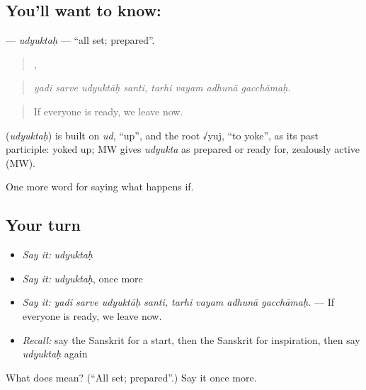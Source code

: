 \subsection*{You'll want to know: }
\textbf{} — \emph{udyuktaḥ} — \textquotedblleft{}all set; prepared\textquotedblright{}.

\begin{quote}
   ,    
\end{quote}

\begin{quote}
\emph{yadi sarve udyuktāḥ santi, tarhi vayam adhunā gacchāmaḥ.}
\end{quote}

\begin{quote}
If everyone is ready, we leave now.
\end{quote}

\begin{cousinweb}
\textbf{} (\emph{udyuktaḥ}) is built on \emph{ud}, \textquotedblleft{}up\textquotedblright{}, and the root √yuj, \textquotedblleft{}to yoke\textquotedblright{}, as its past participle: yoked up; MW gives \emph{udyukta} as prepared or ready for, zealously active (MW).
\end{cousinweb}

\begin{grammarlens}[title={What you've built}]
One more word for saying what happens if.
\end{grammarlens}

\subsection*{Your turn}
\begin{itemize}
\raggedright
  \item \emph{Say it:} \emph{udyuktaḥ}
  \item \emph{Say it:} \emph{udyuktaḥ}, once more
  \item \emph{Say it:} \emph{yadi sarve udyuktāḥ santi, tarhi vayam adhunā gacchāmaḥ.} — If everyone is ready, we leave now.
  \item \emph{Recall:} say the Sanskrit for a start, then the Sanskrit for inspiration, then say \emph{udyuktaḥ} again
\end{itemize}

\begin{tcolorbox}[breakable,colback=teal!4,colframe=teal!35!black,title={Before you move on}]
What does  mean? (\textquotedblleft{}All set; prepared\textquotedblright{}.) Say it once more.
\end{tcolorbox}
